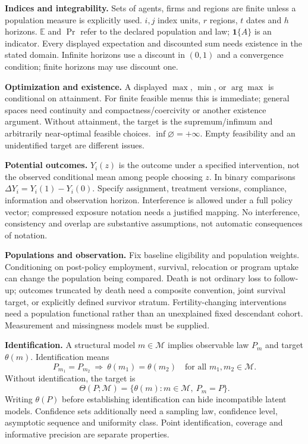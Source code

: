 \documentclass[11pt,a4paper]{article}
\begin{document}
\textbf{Indices and integrability.} Sets of agents, firms and regions are finite unless a population measure is explicitly used. \(i,j\) index units, \(r\) regions, \(t\) dates and \(h\) horizons. \(\mathbb E\) and \(\Pr\) refer to the declared population and law; \(\mathbf1\{A\}\) is an indicator. Every displayed expectation and discounted sum needs existence in the stated domain. Infinite horizons use a discount in \((0,1)\) and a convergence condition; finite horizons may use discount one.

\textbf{Optimization and existence.} A displayed \(\max\), \(\min\), or \(\arg\max\) is conditional on attainment. For finite feasible menus this is immediate; general spaces need continuity and compactness/coercivity or another existence argument. Without attainment, the target is the supremum/infimum and arbitrarily near-optimal feasible choices. \(\inf\varnothing=+\infty\). Empty feasibility and an unidentified target are different issues.

\textbf{Potential outcomes.} \(Y_i(z)\) is the outcome under a specified intervention, not the observed conditional mean among people choosing \(z\). In binary comparisons \(\Delta Y_i=Y_i(1)-Y_i(0)\). Specify assignment, treatment versions, compliance, information and observation horizon. Interference is allowed under a full policy vector; compressed exposure notation needs a justified mapping. No interference, consistency and overlap are substantive assumptions, not automatic consequences of notation.

\textbf{Populations and observation.} Fix baseline eligibility and population weights. Conditioning on post-policy employment, survival, relocation or program uptake can change the population being compared. Death is not ordinary loss to follow-up; outcomes truncated by death need a composite convention, joint survival target, or explicitly defined survivor stratum. Fertility-changing interventions need a population functional rather than an unexplained fixed descendant cohort. Measurement and missingness models must be supplied.

\textbf{Identification.} A structural model \(m\in\mathcal M\) implies observable law \(P_m\) and target \(\theta(m)\). Identification means
\[
 P_{m_1}=P_{m_2}\ \Longrightarrow\ \theta(m_1)=\theta(m_2)
 \quad\text{for all }m_1,m_2\in\mathcal M .
\]
Without identification, the target is
\[
 \Theta(P;\mathcal M)=\{\theta(m):m\in\mathcal M,\ P_m=P\}.
\]
Writing \(\theta(P)\) before establishing identification can hide incompatible latent models. Confidence sets additionally need a sampling law, confidence level, asymptotic sequence and uniformity class. Point identification, coverage and informative precision are separate properties.
\end{document}

